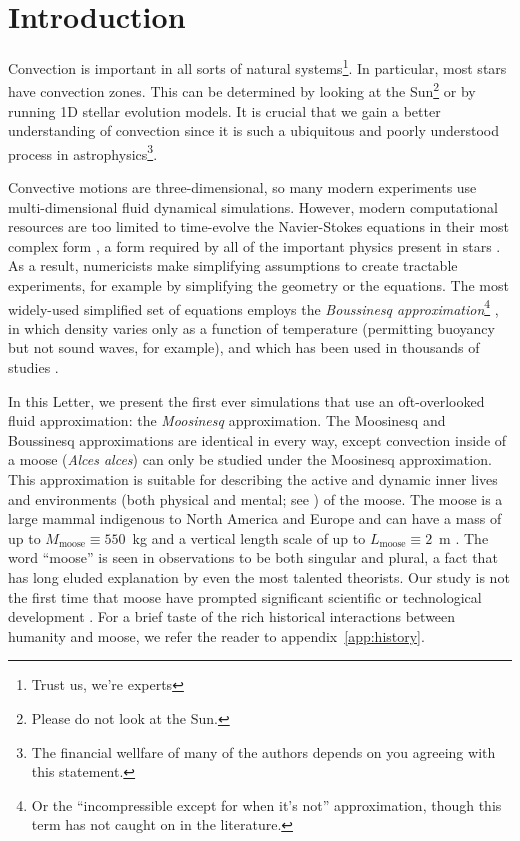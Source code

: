 \section{Introduction}
\label{sec:introduction}

Convection is important in all sorts of natural systems\footnote{Trust us, we're experts}.
In particular, most stars have convection zones.
This can be determined by looking at the Sun\footnote{Please do not look at the Sun.} or by running 1D stellar evolution models.
It is crucial that we gain a better understanding of convection since it is such a ubiquitous and poorly understood process in astrophysics\footnote{The financial wellfare of many of the authors depends on you agreeing with this statement.}.

Convective motions are three-dimensional, so many modern experiments use multi-dimensional fluid dynamical simulations.
However, modern computational resources are too limited to time-evolve the Navier-Stokes equations in their most complex form \citep{landau}, a form required by all of the important physics present in stars \citep{Paxton2011, Paxton2013, Paxton2015, Paxton2018, Paxton2019}.
As a result, numericists make simplifying assumptions to create tractable experiments, for example by simplifying the geometry or the equations.
The most widely-used simplified set of equations employs the \emph{Boussinesq approximation}\footnote{Or the ``incompressible except for when it's not'' approximation, though this term has not caught on in the literature.} \citep{spiegel_veronis_1960}, in which density varies only as a function of temperature (permitting buoyancy but not sound waves, for example), and which has been used in thousands of studies \citep[see e.g.,][]{ahlers_etal_2009}.

In this Letter, we present the first ever simulations that use an oft-overlooked fluid approximation: the \emph{Moosinesq} approximation.
The Moosinesq and Boussinesq approximations are identical in every way, except convection inside of a moose (\emph{Alces alces}) can only be studied under the Moosinesq approximation.
This approximation is suitable for describing the active and dynamic inner lives and environments (both physical and mental; see \citealp{Gibson2015}) of the moose.
The moose is a large mammal indigenous to North America and Europe and can have a mass of up to $M_\mathrm{moose}\equiv 550$~kg and a vertical length scale of up to $L_\mathrm{moose} \equiv 2$~m \citep{CPWmoose}.
The word ``moose'' is seen in observations to be both singular and plural, a fact that has long eluded explanation by even the most talented theorists.
Our study is not the first time that moose have prompted significant scientific or technological development \citep[see, e.g.,][]{Handel2009}.
For a brief taste of the rich historical interactions between humanity and moose, we refer the reader to appendix~\ref{app:history}.

